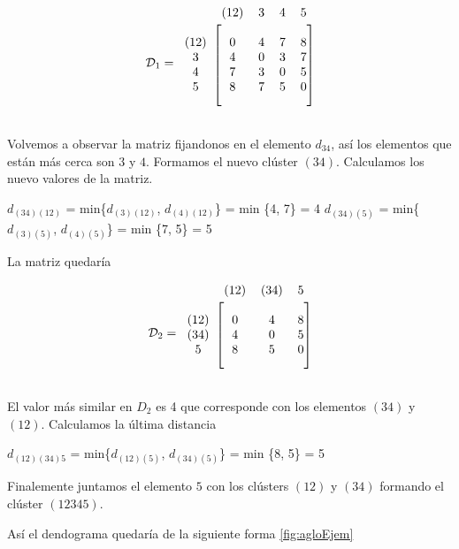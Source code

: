 \documentclass[a4paper, 20pt]{article}
\begin{document}
\[ \mathcal{D}_1  =
\begin{blockarray}{ccccc}
	& (12) & 3 & 4 & 5 \\
	\begin{block}{c[cccc]}
		\\
		(12) & 0 & 4 & 7 & 8 \\
		3 & 4 & 0 & 3 & 7 \\
		4 & 7 & 3 & 0 & 5 \\
		5 & 8 & 7 & 5 & 0 \\
		\\
	\end{block}
\end{blockarray}  
\] 

Volvemos a observar la matriz fijandonos en el elemento $d_{34}$, así los elementos que están más cerca son $3$ y $4$. Formamos el nuevo clúster $(34)$. Calculamos los nuevo valores de la matriz.

\begin{center}
	$d_{(34)(12)}$ = min\{$d_{(3)(12)}$, $d_{(4)(12)}$\} = min \{4, 7\} = 4
	$d_{(34)(5)}$ = min\{$d_{(3)(5)}$, $d_{(4)(5)}$\} = min \{7, 5\} = 5
\end{center}

La matriz quedaría

\[ \mathcal{D}_2  =
\begin{blockarray}{cccc}
	& (12) & (34) & 5 \\
	\begin{block}{c[ccc]}
		\\
		(12) & 0 & 4 & 8 \\
		(34) & 4 & 0 & 5 \\
		5 & 8 & 5 & 0 \\
		\\
	\end{block}
\end{blockarray}  
\] 

El valor más similar en $D_2$ es 4 que corresponde con los elementos $(34)$ y $(12)$. Calculamos la última distancia

\begin{center}
	$d_{(12)(34)5}$ = min\{$d_{(12)(5)}$, $d_{(34)(5)}$\} = min \{8, 5\} = 5
\end{center}

Finalemente juntamos el elemento $5$ con los clústers $(12)$ y $(34)$ formando el clúster $(12345)$.

Así el dendograma quedaría de la siguiente forma \ref{fig:agloEjem}
\end{document}
